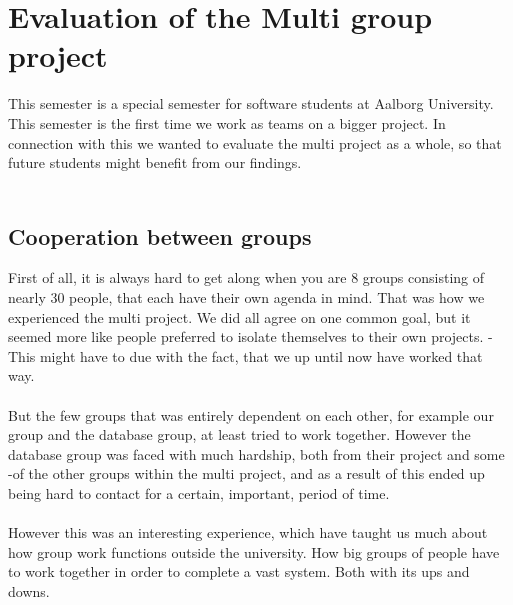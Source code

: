 \section{Evaluation of the Multi group project}
\label{sec:multiEval}
This semester is a special semester for software students at Aalborg University. This semester is the first time we work as teams on a bigger project. In connection with this we wanted to evaluate the multi project as a whole, so that future students might benefit from our findings.\\
\\
\subsection{Cooperation between groups}
First of all, it is always hard to get along when you are 8 groups consisting of nearly 30 people, that each have their own agenda in mind. That was how we experienced the multi project. We did all agree on one common goal, but it seemed more like people preferred to isolate themselves to their own projects. - This might have to due with the fact, that we up until now have worked that way.\\
\\
But the few groups that was entirely dependent on each other, for example our group and the database group, at least tried to work together. However the database group was faced with much hardship, both from their project and some -of the other groups within the multi project, and as a result of this ended up being hard to contact for a certain, important, period of time.\\
\\
However this was an interesting experience, which have taught us much about how group work functions outside the university. How big groups of people have to work together in order to complete a vast system. Both with its ups and downs.


